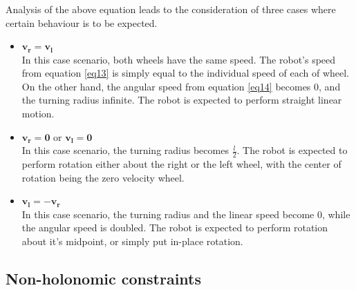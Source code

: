 Analysis of the above equation leads to the consideration of three cases where certain behaviour is to be expected.

\begin{itemize} \label{list_v}

\item $\boldsymbol{v_r = v_l}$ \\ In this case scenario, both wheels have the same speed. The robot's speed from equation \ref{eq13} is simply equal to the individual speed of each of wheel. On the other hand, the angular speed from equation \ref{eq14} becomes 0, and the turning radius infinite. The robot is expected to perform straight linear motion.

\item $\boldsymbol{v_r = 0}$ or $\boldsymbol{v_l = 0}$ \\ In this case scenario, the turning radius becomes $\frac{l}{2}$. The robot is expected to perform rotation either about the right or the left wheel, with the center of rotation being the zero velocity wheel. 

\item $\boldsymbol{v_l = -v_r}$ \\ In this case scenario, the turning radius and the linear speed become 0, while the angular speed is doubled. The robot is expected to perform rotation about it's midpoint, or simply put in-place rotation.

\end{itemize}

\subsection{Non-holonomic constraints} 

